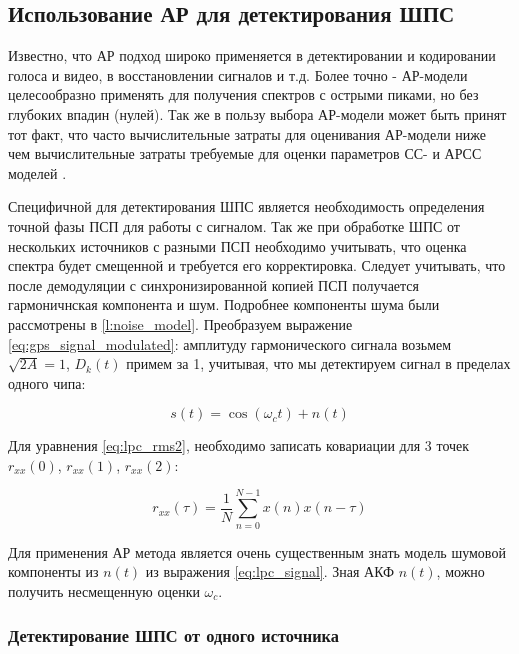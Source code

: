 \subsection{Использование АР для детектирования ШПС}
\label{ssec:lpc}
Известно, что АР подход широко применяется в детектировании и кодировании голоса и видео, в восстановлении сигналов и т.д.
Более точно - АР-модели целесообразно применять для получения спектров с острыми пиками, но без глубоких впадин (нулей).
Так же в пользу выбора АР-модели может быть принят тот факт, что часто вычислительные затраты для оценивания АР-модели 
ниже чем вычислительные затраты требуемые для оценки параметров СС- и АРСС моделей \cite{marpl_book}.

Специфичной для детектирования ШПС является необходимость определения точной фазы ПСП
для работы с сигналом. Так же при обработке ШПС от нескольких источников с разными ПСП необходимо учитывать,
что оценка спектра будет смещенной и требуется его корректировка. Следует учитывать, что после демодуляции
с синхронизированной копией ПСП получается гармоничнская компонента и шум. Подробнее компоненты шума были
рассмотрены в \ref{l:noise_model}. Преобразуем выражение \ref{eq:gps_signal_modulated}: амплитуду гармонического
сигнала возьмем ${\sqrt{2A} = 1}$, ${D_k(t)}$ примем за 1, учитывая, что мы детектируем сигнал в пределах одного
чипа:
\begin{center}
\begin{equation}
	\label{eq:lpc_signal}
	s(t) = \cos(\omega_{c}t) + n(t)
\end{equation}
\end{center}

Для уравнения \ref{eq:lpc_rms2}, необходимо записать ковариации для 3 точек
${r_{xx}(0)}$, ${r_{xx}(1)}$, ${r_{xx}(2)}$:

\begin{center}
\begin{equation}
	\label{eq:lpc_cov}
	{r_{xx}(\tau) = \frac{1}{N} \sum \limits_{n=0}^{N-1} x(n) x(n-\tau)}
\end{equation}
\end{center}

Для применения АР метода является очень существенным знать модель шумовой компоненты из ${n(t)}$ из выражения
\ref{eq:lpc_signal}. Зная АКФ ${n(t)}$, можно получить несмещенную оценки ${\omega_c}$.

\subsubsection{Детектирование ШПС от одного источника}

